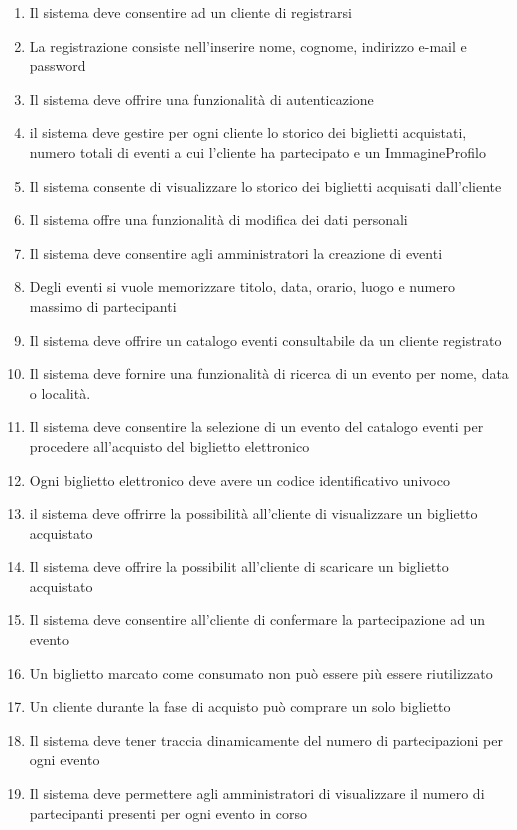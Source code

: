 \begin{enumerate}[]
    \item Il sistema deve consentire ad un cliente di registrarsi
    \item La registrazione consiste nell’inserire nome, cognome, indirizzo e-mail e password
    \item Il sistema deve offrire una funzionalità di autenticazione
    \item il sistema deve gestire per ogni cliente lo storico dei biglietti acquistati, numero totali di eventi a cui l’cliente ha partecipato e un ImmagineProfilo
    \item Il sistema consente di visualizzare lo storico dei biglietti acquisati dall'cliente
    \item Il sistema offre una funzionalità di modifica dei dati personali
    \item Il sistema deve consentire agli amministratori la creazione di eventi
    \item Degli eventi si vuole memorizzare titolo, data, orario, luogo e numero massimo di partecipanti
    \item Il sistema deve offrire un catalogo eventi consultabile da un cliente registrato
    \item Il sistema deve fornire una funzionalità di ricerca di un evento per nome, data o località.
    \item Il sistema deve consentire la selezione di un evento del catalogo eventi per procedere all’acquisto del biglietto elettronico
    \item Ogni biglietto elettronico deve avere un codice identificativo univoco
    \item il sistema deve offrirre la possibilità all'cliente di visualizzare un biglietto acquistato
    \item Il sistema deve offrire la possibilit all'cliente di scaricare un biglietto acquistato
    \item Il sistema deve consentire all’cliente di confermare la partecipazione ad un evento
    \item Un biglietto marcato come consumato non può essere più essere riutilizzato
    \item Un cliente durante la fase di acquisto può comprare un solo biglietto
    \item Il sistema deve tener traccia dinamicamente del numero di partecipazioni per ogni evento
    \item Il sistema deve permettere agli amministratori di visualizzare il numero di partecipanti presenti per ogni evento in corso

\end{enumerate}
